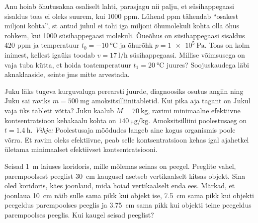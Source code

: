 \documentclass[10pt]{article}
\begin{document}

Anu hoiab õhutusakna osaliselt lahti, parasjagu nii palju, et süsihappegaasi sisaldus toas ei oleks suurem, kui 1000 ppm. Lühend ppm tähendab ``osakest miljoni kohta'', st antud juhul ei tohi iga miljoni õhumolekuli kohta olla õhus rohkem, kui 1000 süsihappegaasi molekuli. Õueõhus on süsihappegaasi sisaldus 420 ppm ja temperatuur  $t_0=\SI{-10}{\celsius}$ ja õhurõhk $p=\SI{1e5}{\pascal}$. Toas on kolm inimest, kellest igaüks toodab $v=\SI{17}{\litre\per\hour}$  süsihappegaasi. Millise võimsusega on vaja tuba kütta, et hoida toatemperatuur $t_1=\SI{20}{\celsius}$ juures? Soojuskaudega läbi aknaklaaside, seinte jms mitte arvestada.
\probend
\bigskip


Juku läks tugeva kurguvaluga perearsti juurde, diagnoosiks osutus angiin ning Juku sai raviks $m= \SI{500}{\milli\gram}$ amoksitsilliinitabletid. Kui pika aja tagant on Jukul vaja üks tablett võtta? Juku kaalub $M= \SI{70}{\kilo\gram}$, ravimi minimaalne efektiivne kontsentratsioon kehakaalu kohta on $\SI{140}{\ug\per\kg}$. Amoksitsilliini poolestusaeg on $t= \SI{1.4}{\hour}$. \textit{Vihje:} Poolestusaja möödudes langeb aine kogus organismis poole võrra. Et ravim oleks efektiivne, peab selle kontsentratsioon kehas igal ajahetkel ületama minimaalset efektiivset kontsentratsiooni.
\probend
\bigskip


Seisad \SI{1}{\m} laiuses koridoris, mille mõlemas seinas on peegel. Peeglite vahel, parempoolsest peeglist \SI{30}{\cm} kaugusel asetseb vertikaalselt kitsas objekt. Sina oled koridoris, käes joonlaud, mida hoiad vertikaalselt enda ees. Märkad, et joonlaua \SI{10}{\cm} näib sulle sama pikk kui objekt ise, \SI{7.5}{\cm} sama pikk kui objekti peegeldus parempoolses peeglis ja \SI{3.75}{\cm} sama pikk kui objekti teine peegeldus parempoolses peeglis. Kui kaugel seisad peeglist?
\probend
\bigskip

\end{document}
